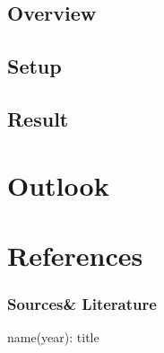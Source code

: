 \documentclass{beamer}
\begin{document}
\subsection{Overview} %
\subsection{Setup} %








\subsection{Result} %

\section{Outlook} %


\section[Sources]{References}
\begin{frame} \frametitle{Sources\& Literature}
\begin{thebibliography}{9}
  {name(year): title} 
\end{thebibliography}
\end{frame}
\end{document}
